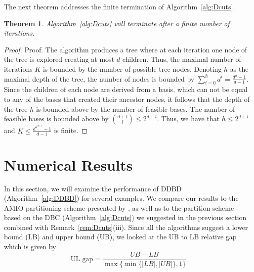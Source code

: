 \documentclass[12pt,x11names]{article}
\newtheorem{theorem}{Theorem} %
\theoremstyle{definition}
\begin{document}
The next theorem addresses the finite termination of Algorithm~\ref{alg:Dcuts}.
\begin{theorem}
Algorithm~\ref{alg:Dcuts} will terminate after a finite number of iterations.
\end{theorem}
\begin{proof}{Proof.}
The algorithm produces a tree where at each iteration one node of the tree is explored creating at most $d$ children. Thus, the maximal number of iterations $K$ is bounded by the number of possible tree nodes. Denoting $h$ as the maximal depth of the tree, the number of nodes is bounded by $\sum_{i=0}^{h} d^{i}=\frac{d^h-1}{d-1}$. 
Since the children of each node are derived from a basis, which can not be equal to any of the bases that created their ancestor nodes, it follows that the depth of the tree $h$ is bounded above by the number of feasible bases. The number of feasible bases is bounded above by ${{d+l}\choose{l}}\leq {2^{d+l}}$. Thus, we have that
$h\leq {2^{d+l}}$ and $K\leq \frac{d^{2^{d+l}}-1}{d-1}$ is finite. %
\end{proof}

\section{Numerical Results}\label{sec:NumericalResults}
In this section, we will examine the performance of DDBD (Algorithm~\ref{alg:DDBD}) for several examples. We compare our results to the AMIO partitioning scheme presented by \citet{BertsimasDunning2014}, as well as to the partition scheme based on the DBC (Algorithm~\ref{alg:Dcuts}) we suggested in the previous section combined with Remark~\ref{rem:Dcuts}(iii). %
Since all the algorithms suggest a lower bound (LB) and upper bound (UB), we looked at the UB to LB relative gap which is given by 
$$\text{UL gap}=\frac{UB-LB}{\max\{\min\{|LB|,|UB|\},1\}}$$
\end{document}
